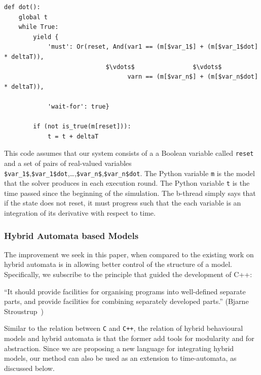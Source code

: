 \documentclass[11pt]{article}
\begin{document}
\begin{lstlisting}[caption={A b-thread that specifies that the `dot' version of each variable is its derivative using a simple linear approximation.},captionpos=b,frame = single]
def dot():
	global t
	while True:
		yield {
			'must': Or(reset, And(var1 == (m[$var_1$] + (m[$var_1$dot] * deltaT)),
							$\vdots$                $\vdots$ 
			                      varn == (m[$var_n$] + (m[$var_n$dot] * deltaT)),
	
			'wait-for': true}
	
		if (not is_true(m[reset])):
			t = t + deltaT            
\end{lstlisting}

This code assumes that our system consists of a a Boolean variable called \lstinline{reset} and a set of pairs of real-valued variables \lstinline{$var_1$},\lstinline{$var_1$dot},\dots,\lstinline{$var_n$},\lstinline{$var_n$dot}. The Python variable \lstinline{m} is the model that the solver produces in each execution round. The Python variable \lstinline{t} is the time passed since the beginning of the simulation. The b-thread simply says that if the state does not reset, it must progress such that the each variable is an integration of its derivative with respect to time.


\subsubsection{Hybrid Automata based Models}
\label{sec:hybrid-automata}
The improvement we seek in this paper, when compared to the existing work on hybrid automata is in allowing better control of the structure of a model. Specifically, we subscribe to the principle that guided the development of C++:

\begin{quoting}
	``It should provide facilities for organising programs into well-defined separate parts, and provide facilities for combining separately developed parts.'' (Bjarne Stroustrup~\cite{Stroustrup07})
\end{quoting} 

Similar to the relation between \lstinline{C} and \lstinline{C++}, the relation of hybrid behavioural models and hybrid automata is that the former add tools for modularity and for abstraction. Since we are proposing a new language for integrating hybrid models, our method can also be used as an extension to time-automata, as discussed below.
\end{document}
